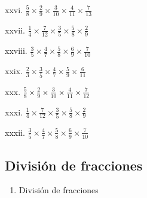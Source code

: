 \documentclass[]{book}
\providecommand{\tightlist}{%
  \setlength{\itemsep}{0pt}\setlength{\parskip}{0pt}}
\begin{document}
\begin{multicols}{2}
    xxvi. $\frac{5}{8} \times \frac{2}{9} \times \frac{3}{10} \times \frac{4}{11} \times \frac{7}{13}$
 
    xxvii. $\frac{1}{4} \times \frac{7}{12} \times \frac{3}{5} \times \frac{5}{8} \times \frac{2}{9}$
 
    xxviii. $\frac{3}{5} \times \frac{4}{7} \times \frac{5}{8} \times \frac{6}{9} \times \frac{7}{10}$
 
    xxix. $\frac{2}{3} \times \frac{3}{5} \times \frac{4}{7} \times \frac{5}{9} \times \frac{6}{11}$
 
    xxx. $\frac{5}{8} \times \frac{2}{9} \times \frac{3}{10} \times \frac{4}{11} \times \frac{7}{12}$
 
    xxxi. $\frac{1}{4} \times \frac{7}{12} \times \frac{3}{5} \times \frac{5}{8} \times \frac{2}{9}$
 
    xxxii. $\frac{3}{5} \times \frac{4}{7} \times \frac{5}{8} \times \frac{6}{9} \times \frac{7}{10}$
\end{multicols}

\subsection{División de fracciones}\label{divisiuxf3n-de-fracciones}

\begin{enumerate}
\def\labelenumi{\arabic{enumi}.}
\setcounter{enumi}{3}
\tightlist
\item
  División de fracciones
\end{enumerate}
\end{document}
